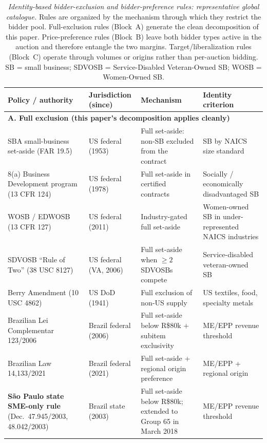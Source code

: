 \begin{table}[p]
\centering
\scriptsize
\caption[Identity-based bidder-exclusion and bidder-preference rules: representative global catalogue.]{\textit{Identity-based bidder-exclusion and bidder-preference rules: representative global catalogue.} Rules are organized by the mechanism through which they restrict the bidder pool. Full-exclusion rules (Block~A) generate the clean decomposition of this paper. Price-preference rules (Block~B) leave both bidder types active in the auction and therefore entangle the two margins. Target/liberalization rules (Block~C) operate through volumes or origins rather than per-auction bidding. SB = small business; SDVOSB = Service-Disabled Veteran-Owned SB; WOSB = Women-Owned SB.}
\label{tab:v3_external_policies}
\begin{threeparttable}
\begin{tabular}{p{4.8cm}p{2.6cm}p{3.2cm}p{3.6cm}}
\toprule
\textbf{Policy / authority} & \textbf{Jurisdiction (since)} & \textbf{Mechanism} & \textbf{Identity criterion} \\
\midrule
\multicolumn{4}{l}{\textbf{A. Full exclusion (this paper's decomposition applies cleanly)}} \\
SBA small-business set-aside (FAR 19.5) & US federal (1953) & Full set-aside: non-SB excluded from the contract & SB by NAICS size standard \\
8(a) Business Development program (13 CFR 124) & US federal (1978) & Full set-aside in certified contracts & Socially / economically disadvantaged SB \\
WOSB / EDWOSB (13 CFR 127) & US federal (2011) & Industry-gated full set-aside & Women-owned SB in under-represented NAICS industries \\
SDVOSB ``Rule of Two'' (38 USC 8127) & US federal (VA, 2006) & Full set-aside when $\geq 2$ SDVOSBs compete & Service-disabled veteran-owned SB \\
Berry Amendment (10 USC 4862) & US DoD (1941) & Full exclusion of non-US supply & US textiles, food, specialty metals \\
Brazilian Lei Complementar 123/2006 & Brazil federal (2006) & Full set-aside below R\$80k + subitem exclusivity & ME/EPP revenue threshold \\
Brazilian Law 14{,}133/2021 & Brazil federal (2021) & Full set-aside + regional origin preference & ME/EPP + regional origin \\
\textbf{S\~ao Paulo state SME-only rule} (Dec.\ 47.945/2003, 48.042/2003) & Brazil state (2003) & Full set-aside below R\$80k; extended to Group 65 in March 2018 & ME/EPP revenue threshold \\

\end{tabular}
\end{threeparttable}
\end{table}
